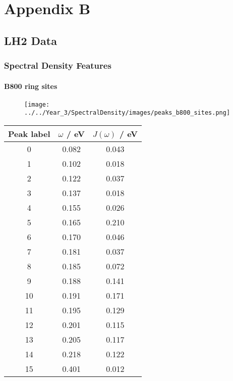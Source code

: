 %
%

\chapter{Appendix B}
\label{app:app02}
\section{LH2 Data}
\label{sec:lh2_data}

\subsection{Spectral Density Features}
\label{subsec:specdens_features}
\subsubsection{B800 ring sites}
\label{subsubsec:specdens_b800}

\begin{figure}
    \centering
    \texttt{[image: ../../Year\_3/SpectralDensity/images/peaks\_b800\_sites.png]}
\end{figure}

\begin{table}
    \centering
    \begin{tabular}{||c c c||}
    \hline
    Peak label & $\omega$ / eV & $J\left(\omega\right)$ / eV \\
    \hline\hline
    
     0 & 0.082 & 0.043 \\
     1 & 0.102 & 0.018 \\
     2 & 0.122 & 0.037 \\
     3 & 0.137 & 0.018 \\
     4 & 0.155 & 0.026 \\
     5 & 0.165 & 0.210 \\
     6 & 0.170 & 0.046 \\
     7 & 0.181 & 0.037 \\
     8 & 0.185 & 0.072 \\
     9 & 0.188 & 0.141 \\
     10 & 0.191 & 0.171 \\
     11 & 0.195 & 0.129 \\
     12 & 0.201 & 0.115 \\
     13 & 0.205 & 0.117 \\
     14 & 0.218 & 0.122 \\
     15 & 0.401 & 0.012 \\
    \hline 
    \end{tabular}
\end{table}


